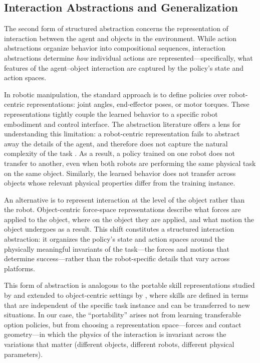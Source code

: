 \subsection{Interaction Abstractions and Generalization}
\label{sec:interaction_abstractions}

The second form of structured abstraction concerns the representation of interaction between the agent and objects in the environment. While action abstractions organize behavior into compositional sequences, interaction abstractions determine \emph{how} individual actions are represented---specifically, what features of the agent--object interaction are captured by the policy's state and action spaces.

In robotic manipulation, the standard approach is to define policies over robot-centric representations: joint angles, end-effector poses, or motor torques. These representations tightly couple the learned behavior to a specific robot embodiment and control interface. The abstraction literature offers a lens for understanding this limitation: a robot-centric representation fails to abstract away the details of the agent, and therefore does not capture the natural complexity of the task \citep{konidaris2019necessity}. As a result, a policy trained on one robot does not transfer to another, even when both robots are performing the same physical task on the same object. Similarly, the learned behavior does not transfer across objects whose relevant physical properties differ from the training instance.

An alternative is to represent interaction at the level of the object rather than the robot. Object-centric force-space representations describe what forces are applied to the object, where on the object they are applied, and what motion the object undergoes as a result. This shift constitutes a structured interaction abstraction: it organizes the policy's state and action spaces around the physically meaningful invariants of the task---the forces and motions that determine success---rather than the robot-specific details that vary across platforms.

This form of abstraction is analogous to the portable skill representations studied by \citet{konidaris2007building} and extended to object-centric settings by \citet{james2022autonomous}, where skills are defined in terms that are independent of the specific task instance and can be transferred to new situations. In our case, the ``portability'' arises not from learning transferable option policies, but from choosing a representation space---forces and contact geometry---in which the physics of the interaction is invariant across the variations that matter (different objects, different robots, different physical parameters).

